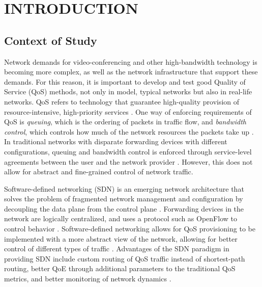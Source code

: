 \chapter{INTRODUCTION}

\section{Context of Study}

Network demands for video-conferencing and other high-bandwidth technology is becoming more complex, as well as the network infrastructure that support these demands. For this reason, it is important to develop and test good Quality of Service (QoS) methods, not only in model, typical networks but also in real-life networks. QoS refers to technology that guarantee high-quality provision of resource-intensive, high-priority services \cite{noauthor_what_nodate}. One way of enforcing requirements of QoS is \textit{queuing}, which is the ordering of packets in traffic flow, and \textit{bandwidth control}, which controls how much of the network resources the packets take up \cite{zhao_internet_2000}. In traditional networks with disparate forwarding devices with different configurations, queuing and bandwidth control is enforced through service-level agreements between the user and the network provider \cite{karakus_quality_2017}. However, this does not allow for abstract and fine-grained control of network traffic.

Software-defined networking (SDN) is an emerging network architecture that solves the problem of fragmented network management and configuration by decoupling the data plane from the control plane \cite{kreutz_software-defined_2015}. Forwarding devices in the network are logically centralized, and uses a protocol such as OpenFlow to control behavior \cite{kreutz_software-defined_2015}. Software-defined networking allows for QoS provisioning to be implemented with a more abstract view of the network, allowing for better control of different types of traffic \cite{karakus_quality_2017}. Advantages of the SDN paradigm in providing SDN include custom routing of QoS traffic instead of shortest-path routing, better QoE through additional parameters to the traditional QoS metrics, and better monitoring of network dynamics \cite{karakus_quality_2017}.

